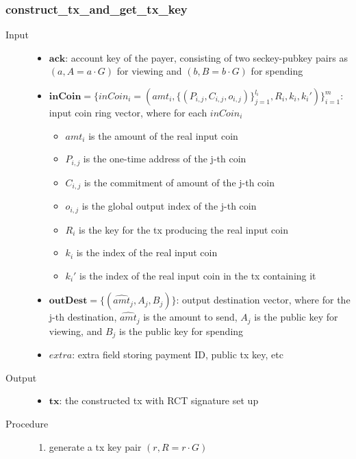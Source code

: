 \subsubsection{construct\_tx\_and\_get\_tx\_key} 
	\begin{description}
		\item[Input]
			\begin{itemize}
				\item \(\mathbf{ack}\): account key of the payer, consisting of two seckey-pubkey pairs as \( (a,A=a\cdot G)\) for viewing and \( (b,B=b\cdot G)\) for spending
				\item \(\mathbf{inCoin}=\{inCoin_i=(amt_i,\{(P_{i,j},C_{i,j},o_{i,j})\}_{j=1}^{l_i},R_i,k_i,k_i')\}_{i=1}^m\): input coin ring vector, where for each \(inCoin_i\)
					\begin{itemize}
						\item \(amt_i\) is the amount of the real input coin
						\item \(P_{i,j}\) is the one-time address of the j-th coin
						\item \(C_{i,j}\) is the commitment of amount of the j-th coin
						\item \(o_{i,j}\) is the global output index of the j-th coin
						\item \(R_i\) is the key for the tx producing the real input coin
						\item \(k_i\) is the index of the real input coin
						\item \(k_i'\) is the index of the real input coin in the tx containing it
					\end{itemize}
				\item \(\mathbf{outDest}=\{(\hat{amt}_j,A_j,B_j)\}\): output destination vector, where for the j-th destination, \(\hat{amt}_j\) is the amount to send, \(A_j\) is the public key for viewing, and \(B_j\) is the public key for spending
					\item \(extra\): extra field storing payment ID, public tx key, etc
			\end{itemize}
		\item[Output] 
			\begin{itemize}
				\item \(\mathbf{tx}\): the constructed tx with RCT signature set up
			\end{itemize}
		\item[Procedure]
			\begin{enumerate}
				\item generate a tx key pair \( (r,R=r\cdot G)\)

\end{enumerate}
\end{description}
